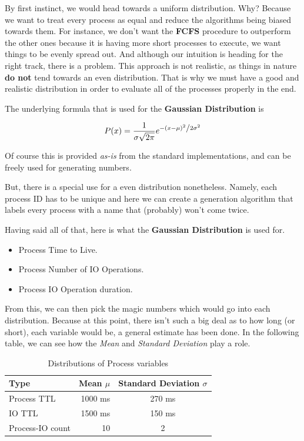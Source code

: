 \documentclass{article}
\newcommand{\code}[1]{\codeinline{\texttt{#1}}}
\begin{document}
By first instinct, we would head towards a uniform distribution. Why? Because we want to treat every process as equal and reduce the algorithms being biased towards them. For instance, we don't want the \textbf{FCFS} procedure to outperform the other ones because it is having more short processes to execute, we want things to be evenly spread out. And although our intuition is heading for the right track, there is a problem. This approach is not realistic, as things in nature \textbf{do not} tend towards an even distribution. That is why we must have a good and realistic distribution in order to evaluate all of the processes properly in the end.

The underlying formula that is used for the \textbf{Gaussian Distribution} is

\begin{equation}
P(x) = \frac{1}{{\sigma \sqrt {2\pi } }}e^{{{ - \left( {x - \mu } \right)^2 } \mathord{\left/ {\vphantom {{ - \left( {x - \mu } \right)^2 } {2\sigma ^2 }}} \right. \kern-\nulldelimiterspace} {2\sigma ^2 }}}
\end{equation}

Of course this is provided \textit{as-is} from the standard \code{C++} implementations, and can be freely used for generating numbers.

But, there is a special use for a even distribution nonetheless. Namely, each process ID has to be unique and here we can create a generation algorithm that labels every process with a name that (probably) won't come twice.

Having said all of that, here is what the \textbf{Gaussian Distribution} is used for.

\begin{itemize}
\item Process Time to Live.
\item Process Number of IO Operations.
\item Process IO Operation duration.
\end{itemize}

From this, we can then pick the magic numbers which would go into each distribution. Because at this point, there isn't such a big deal as to how long (or short), each variable would be, a general estimate has been done. In the following table, we can see how the \textit{Mean} and \textit{Standard Deviation} play a role.

\begin{table}[H]
  \begin{center}
    \label{tab:Distributions of Process variables}
    \begin{tabular}{l|r|c}
      \toprule
       \textbf{Type} & \textbf{Mean $\mu$} & \textbf{Standard Deviation $\sigma$} \\
      \midrule
      Process TTL & 1000 ms & 270 ms \\
      IO TTL & 1500 ms & 150 ms \\
      Process-IO count & 10 & 2 \\
      \bottomrule
    \end{tabular}
    \caption{Distributions of Process variables}
  \end{center}
\end{table}
\end{document}
